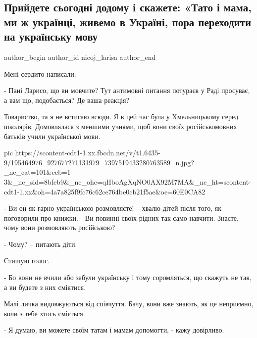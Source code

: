  
 
 
 
 
 
\subsection{Прийдете сьогодні додому і скажете: «Тато і мама, ми ж українці, живемо в Україні, пора переходити на українську мову}
\label{sec:04_06_2021.fb.nicoj_larisa.1.mova_jazyk_hmelnickii}
\ifcmt
 author_begin
   author_id nicoj_larisa
 author_end
\fi

Мені сердито написали:

- Пані Ларисо, що ви мовчите? Тут антимовні питання потураєв у Раді просуває, а вам що, подобається? Де ваша реакція?

Товариство, та я не встигаю всюди. Я в цей час була у Хмельницькому серед
школярів. Домовлялася з меншими учнями, щоб вони своїх російськомовних батьків
учили української мови. 

\ifcmt
  pic https://scontent-cdt1-1.xx.fbcdn.net/v/t1.6435-9/195464976_927677271131979_7397519433280763589_n.jpg?_nc_cat=101&ccb=1-3&_nc_sid=8bfeb9&_nc_ohc=qHboAgXqNO0AX92M7MA&_nc_ht=scontent-cdt1-1.xx&oh=4a7a825f9fc76c62ce764be0cb21f5ae&oe=60E0CA82
\fi

- Ви он як гарно українською розмовляєте! – хвалю дітей після того, як
поговорили про книжки. - Ви повинні своїх рідних так само навчити. Знаєте, чому
вони розмовляють російською?

- Чому? – питають діти.

Стишую голос.

- Бо вони не вчили або забули українську і тому соромляться, що скажуть не так,
а ви будете з них сміятися.

Малі личка видовжуються від співчуття. Бачу, вони вже знають, як це неприємно,
коли з тебе хтось сміється.

- Я думаю, ви можете своїм татам і мамам допомогти, - кажу довірливо.

